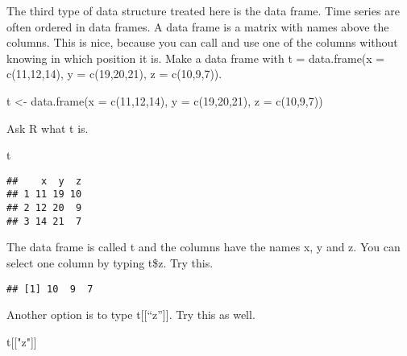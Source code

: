 \documentclass[
]{article}
\newenvironment{Shaded}{\begin{snugshade}}{\end{snugshade}}
\newcommand{\AttributeTok}[1]{\textcolor[rgb]{0.77,0.63,0.00}{#1}}
\newcommand{\DecValTok}[1]{\textcolor[rgb]{0.00,0.00,0.81}{#1}}
\newcommand{\FunctionTok}[1]{\textcolor[rgb]{0.00,0.00,0.00}{#1}}
\newcommand{\NormalTok}[1]{#1}
\newcommand{\OtherTok}[1]{\textcolor[rgb]{0.56,0.35,0.01}{#1}}
\newcommand{\SpecialCharTok}[1]{\textcolor[rgb]{0.00,0.00,0.00}{#1}}
\newcommand{\StringTok}[1]{\textcolor[rgb]{0.31,0.60,0.02}{#1}}
\begin{document}
The third type of data structure treated here is the data frame. Time
series are often ordered in data frames. A data frame is a matrix with
names above the columns. This is nice, because you can call and use one
of the columns without knowing in which position it is. Make a data
frame with t = data.frame(x = c(11,12,14), y = c(19,20,21), z =
c(10,9,7)).

\begin{Shaded}
\begin{Highlighting}[]
\NormalTok{t }\OtherTok{\textless{}{-}} \FunctionTok{data.frame}\NormalTok{(}\AttributeTok{x =} \FunctionTok{c}\NormalTok{(}\DecValTok{11}\NormalTok{,}\DecValTok{12}\NormalTok{,}\DecValTok{14}\NormalTok{), }\AttributeTok{y =} \FunctionTok{c}\NormalTok{(}\DecValTok{19}\NormalTok{,}\DecValTok{20}\NormalTok{,}\DecValTok{21}\NormalTok{), }\AttributeTok{z =} \FunctionTok{c}\NormalTok{(}\DecValTok{10}\NormalTok{,}\DecValTok{9}\NormalTok{,}\DecValTok{7}\NormalTok{))}
\end{Highlighting}
\end{Shaded}

Ask R what t is.

\begin{Shaded}
\begin{Highlighting}[]
\NormalTok{t}
\end{Highlighting}
\end{Shaded}

\begin{verbatim}
##    x  y  z
## 1 11 19 10
## 2 12 20  9
## 3 14 21  7
\end{verbatim}

The data frame is called t and the columns have the names x, y and z.
You can select one column by typing t\$z. Try this.

\begin{Shaded}
\end{Shaded}

\begin{verbatim}
## [1] 10  9  7
\end{verbatim}

Another option is to type t{[}{[}``z''{]}{]}. Try this as well.

\begin{Shaded}
\begin{Highlighting}[]
\NormalTok{t[[}\StringTok{"z"}\NormalTok{]]}
\end{Highlighting}
\end{Shaded}
\end{document}
